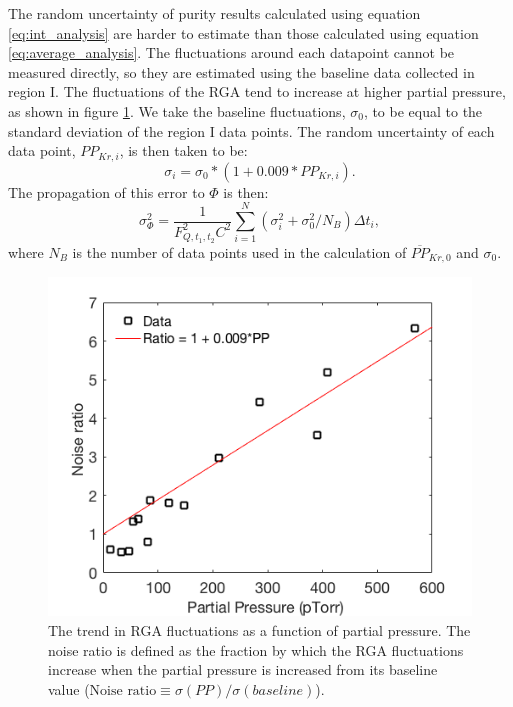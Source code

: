 \documentclass[12pt]{article}
\begin{document}
The random uncertainty of purity results calculated using equation \ref{eq:int_analysis} are harder to estimate than those calculated using equation \ref{eq:average_analysis}. The fluctuations around each datapoint cannot be measured directly, so they are estimated using the baseline data collected in region I. The fluctuations of the RGA tend to increase at higher partial pressure, as shown in figure \ref{fig:RGAnoise}. We take the baseline fluctuations, $\sigma_0$, to be equal to the standard deviation of the region I data points. The random uncertainty of each data point, $PP_{Kr,i}$, is then taken to be:
{\color{red}
\begin{equation}
\sigma_i=\sigma_{0}*(1+0.009*PP_{Kr,i}).
\end{equation}}
The propagation of this error to $\Phi$ is then:
\begin{equation}
\sigma_{\Phi}^2=\frac{1}{F_{Q,t_1,t_2}^2C^2}\sum_{i=1}^{N}(\sigma_i^2+\sigma_0^2/N_B)\Delta t_i,
\end{equation}
where $N_B$ is the number of data points used in the calculation of $\overline{PP}_{Kr,0}$ and $\sigma_0$.
\begin{figure}[h!]
  \includegraphics[width=\linewidth]{Figures/RGA_Noise_v_PP.png}
  \caption{The trend in RGA fluctuations as a function of partial pressure. The noise ratio is defined as the fraction by which the RGA fluctuations increase when the partial pressure is increased from its baseline value ($\textrm{Noise ratio} \equiv \sigma(PP)/\sigma(baseline)$). }
  \label{fig:RGAnoise}
\end{figure}
\end{document}
